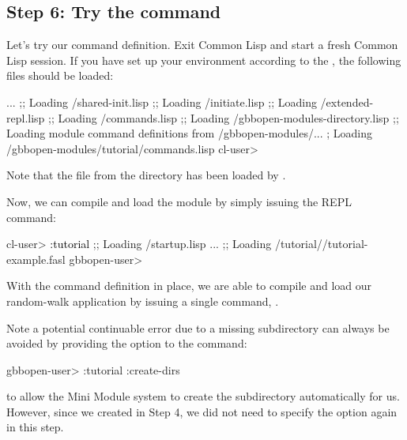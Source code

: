 \documentclass[10pt,twoside,english,pdftex]{article}
\begin{document}
\subsection*{Step 6: Try the  command}

Let's try our command definition.  Exit Common Lisp and start a fresh
Common Lisp session.  If you have set up your environment according to the
,
the following files should be loaded:
%
\W\supp
\begin{example}
\textcolor{darkergray}{%
     ...
  ;; Loading /shared-init.lisp
  ;;   Loading /initiate.lisp
  ;;     Loading /extended-repl.lisp
  ;;     Loading /commands.lisp
  ;;     Loading /gbbopen-modules-directory.lisp
  ;; Loading module command definitions from /gbbopen-modules/...
  ;      Loading /gbbopen-modules/tutorial/commands.lisp
  cl-user>}
\end{example}
%
Note that the  file from the  directory has
been loaded by .

Now, we can compile and load the  module by simply issuing the
 REPL command:
%
\W\supp
\begin{example}
\textcolor{darkergray}{%
  cl-user> \textcolor{black}{:tutorial}
  ;; Loading /startup.lisp
     ...
  ;; Loading /tutorial//tutorial-example.fasl
  gbbopen-user>}
\end{example}
%
With the command definition in place, we are able to compile and load our
random-walk application by issuing a single command, .

Note a potential continuable error due to a missing
 subdirectory can always be avoided by providing
the  option to the  command:
%
\W\supp
\begin{example}
\textcolor{darkergray}{%
  gbbopen-user> :tutorial :create-dirs}
\end{example}
%
to allow the Mini Module system to create the 
subdirectory automatically for us.  However, since we created
 in Step 4, we did not need to specify the
 option again in this step.
\end{document}
